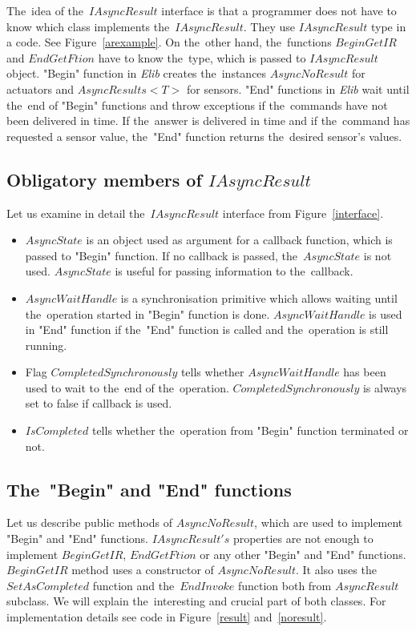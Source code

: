   
  The~idea of the~$IAsyncResult$ interface is that a programmer does not have to know which
  class implements the~$IAsyncResult$. They use $IAsyncResult$ type in a code. See Figure~\ref{arexample}. 
  On the~other hand, the~functions $BeginGetIR$ and $EndGetFtion$ have to know the~type, which is passed to $IAsyncResult$ object.
  "Begin" function in {\it Elib} creates the~instances $AsyncNoResult$ for actuators and $AsyncResults<T>$ for sensors.
  "End" functions in {\it Elib} wait until the~end of "Begin" functions and 
  throw exceptions if the~commands have not been delivered in time.
  If the~answer is delivered in time and if the~command has requested a sensor value, 
  the~"End" function returns the~desired sensor's values.
  
\subsection*{Obligatory members of $IAsyncResult$} \label{sec:iasyncmemb}
  Let us examine in detail the~$IAsyncResult$ interface from Figure~\ref{interface}. 
  \begin{itemize}
  \item $AsyncState$ is an object used as argument for a callback function, which
  is passed to "Begin" function. If no callback is passed, the~$AsyncState$ is not used. 
  $AsyncState$ is useful for passing information to the~callback.
  \item $AsyncWaitHandle$ is a synchronisation primitive which allows waiting until the~operation 
  started in "Begin" function is done.
  $AsyncWaitHandle$ is used in "End" function if the~"End" function is called 
  and the~operation is still running. 
  \item Flag $CompletedSynchronously$ tells whether  
  $AsyncWaitHandle$ has been used to wait to the~end of the~operation.
  $CompletedSynchronously$ is always set to false if callback is used.
  \item $IsCompleted$ tells whether the~operation from "Begin" function terminated or not.
  \end{itemize}

\subsection*{The~"Begin" and "End" functions} \label{sec:beginend}
  Let us describe public methods of $AsyncNoResult$, 
  which are used to implement "Begin" and "End" functions.
  $IAsyncResult's$ properties are not enough to implement $BeginGetIR$,
  $EndGetFtion$ or any other "Begin" and "End" functions.
  $BeginGetIR$ method uses a constructor of $AsyncNoResult$. 
  It also uses the~$SetAsCompleted$ function 
  and the~$EndInvoke$ function both from $AsyncResult$ subclass.
  We will explain the~interesting and crucial part of both classes. 
  For implementation details see code in Figure~\ref{result} and~\ref{noresult}.
  
